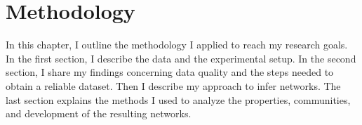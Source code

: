 \chapter{Methodology}
\label{ch:approach}

In this chapter, I outline the methodology I applied to reach my research goals. 
In the first section, I describe the data and the experimental setup.
In the second section, I share my findings concerning data quality and the steps needed to obtain a reliable dataset.
Then I describe my approach to infer networks.
The last section explains the methods I used to analyze the properties, communities, and development of the resulting networks.









